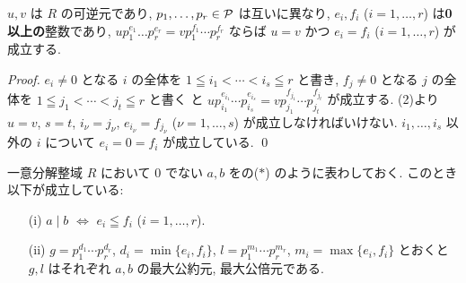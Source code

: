 \documentclass[12pt,twoside]{jarticle}
\begin{document}
\begin{lemma}
\label{lemma:2}
 $u,v$ は $R$ の可逆元であり, 
 $p_1,\ldots,p_r\in{\mathcal P}$ は互いに異なり, 
 $e_i,f_i$ ($i=1,\ldots,r$) は{\bf 0 以上の}整数であり, \(
  up_1^{e_1}\dots p_r^{e_r} = vp_1^{f_1}\cdots p_r^{f_r}
 \) ならば $u=v$ かつ $e_i=f_i$ ($i=1,\ldots,r$) が成立する.
\end{lemma}

\begin{proof}
$e_i\ne 0$ となる $i$ の全体を $1\leqq i_1<\cdots<i_s\leqq r$ と書き, 
$f_j\ne 0$ となる $j$ の全体を $1\leqq j_1<\cdots<j_t\leqq r$ と書く
と $up_{i_1}^{e_{i_1}}\cdots p_{i_s}^{e_{i_s}}
=vp_{j_1}^{f_{j_1}}\cdots p_{j_t}^{f_{j_t}}$ が成立する.
 (2)より $u=v$, $s=t$, $i_\nu=j_\nu$, 
$e_{i_\nu}=f_{j_\nu}$ ($\nu=1,\ldots,s$) が成立しなければいけない.
$i_1,\ldots,i_s$ 以外の $i$ について $e_i=0=f_i$ が成立している.
\qed
\end{proof}

\begin{theorem}
 一意分解整域 $R$ において $0$ でない $a,b$ をの($*$)
 のように表わしておく. このとき以下が成立している:
 \begin{enumerate}
 \item[(i)] $a\mid b$ $\iff$ $e_i\leqq f_i$ ($i=1,\ldots,r$).
 \item[(ii)] $g=p_1^{d_1}\cdots p_r^{d_r}$, $d_i=\min\{e_i,f_i\}$,
  $l=p_1^{m_1}\cdots p_r^{m_r}$, $m_i=\max\{e_i,f_i\}$ とおくと %
  $g,l$ はそれぞれ $a,b$ の最大公約元, 最大公倍元である.
 \end{enumerate}
\end{theorem}
\end{document}

